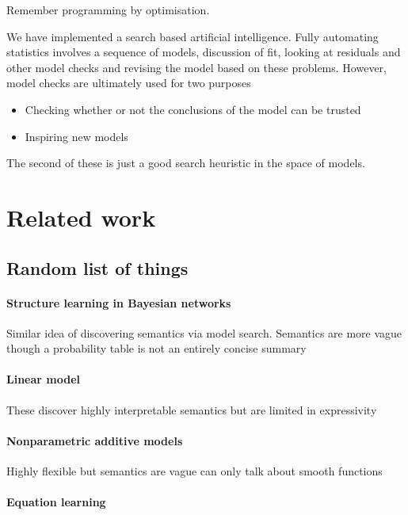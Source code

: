\documentclass[twoside]{article}
\begin{document}
Remember programming by optimisation.

We have implemented a search based artificial intelligence.
Fully automating statistics involves a sequence of models, discussion of fit, looking at residuals and other model checks and revising the model based on these problems.
However, model checks are ultimately used for two purposes
\begin{itemize}
  \item Checking whether or not the conclusions of the model can be trusted
  \item Inspiring new models
\end{itemize}
The second of these is just a good search heuristic in the space of models.

\section{Related work}

\subsection{Random list of things}

\paragraph{Structure learning in Bayesian networks}

Similar idea of discovering semantics via model search.
Semantics are more vague though \ie a probability table is not an entirely concise summary

\paragraph{Linear model}

These discover highly interpretable semantics but are limited in expressivity

\paragraph{Nonparametric additive models}

Highly flexible but semantics are vague \ie can only talk about smooth functions

\paragraph{Equation learning}
\end{document}
